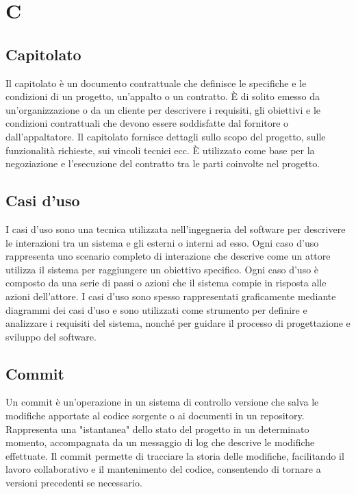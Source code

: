 \section{C}


\vspace{2em}
\subsection*{Capitolato}
Il capitolato è un documento contrattuale che definisce le specifiche e le condizioni di un progetto, un'appalto o un contratto. È di solito emesso da un'organizzazione o da un cliente per descrivere i requisiti, gli obiettivi e le condizioni contrattuali che devono essere soddisfatte dal fornitore o dall'appaltatore. Il capitolato fornisce dettagli sullo scopo del progetto, sulle funzionalità richieste, sui vincoli tecnici ecc. È utilizzato come base per la negoziazione e l'esecuzione del contratto tra le parti coinvolte nel progetto.


\vspace{2em}
\subsection*{Casi d'uso}
I casi d'uso sono una tecnica utilizzata nell'ingegneria del software per descrivere le interazioni tra un sistema e gli  esterni o interni ad esso. Ogni caso d'uso rappresenta uno scenario completo di interazione che descrive come un attore utilizza il sistema per raggiungere un obiettivo specifico. Ogni caso d'uso è composto da una serie di passi o azioni che il sistema compie in risposta alle azioni dell'attore. I casi d'uso sono spesso rappresentati graficamente mediante diagrammi dei casi d'uso e sono utilizzati come strumento per definire e analizzare i requisiti del sistema, nonché per guidare il processo di progettazione e sviluppo del software.


\vspace{2em}
\subsection*{Commit}
Un commit è un'operazione in un sistema di controllo versione che salva le modifiche apportate al codice sorgente o ai documenti in un repository. Rappresenta una "istantanea" dello stato del progetto in un determinato momento, accompagnata da un messaggio di log che descrive le modifiche effettuate. Il commit permette di tracciare la storia delle modifiche, facilitando il lavoro collaborativo e il mantenimento del codice, consentendo di tornare a versioni precedenti se necessario.

